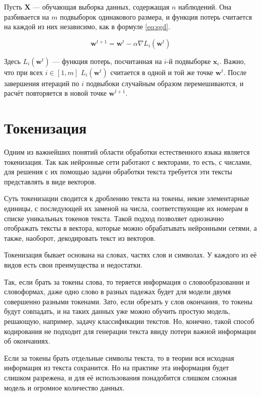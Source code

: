 Пусть $\mathbf{X}$ --- обучающая выборка данных, содержащая $n$ наблюдений. Она разбивается на $m$ подвыборок одинакового размера, и функция потерь считается на каждой из них независимо, как в формуле \ref*{eq:sgd}.

\begin{equation}
    \label{eq:sgd}
    \mathbf{w}^{t+1}=\mathbf{w}^t-\alpha \nabla L_i(\mathbf{w}^t)
\end{equation}

Здесь $L_i(\mathbf{w}^t)$ --- функция потерь, посчитанная на $i$-й подвыборке $\mathbf{x}_i$. Важно, что при всех $i\in[1, m]$ $L_i(\mathbf{w}^t)$ считается в одной и той же точке $\mathbf{w}^t$. После завершения итераций по $i$ подвыбоки случайным образом перемешиваются, и расчёт повторяется в новой точке $\mathbf{w}^{t+1}$.

\section{Токенизация}

Одним из важнейших понятий области обработки естественного языка является токенизация. Так как нейронные сети работают с векторами, то есть, с числами, для решения с их помощью задачи обработки текста требуется эти тексты представлять в виде векторов.

Суть токенизации сводится к дроблению текста на токены, некие элементарные единицы, с последующей их заменой на числа, соответствующие их номерам в списке уникальных токенов текста. Такой подход позволяет однозначно отображать тексты в вектора, которые можно обрабатывать нейронными сетями, а также, наоборот, декодировать текст из векторов.

Токенизация бывает основана на словах, частях слов и символах. У каждого из её видов есть свои преимущества и недостатки.

Так, если брать за токены слова, то теряется информация о словообразовании и словоформах, даже одно слово в разных падежах будет для модели двумя совершенно разными токенами. Зато, если обрезать у слов окончания, то токены будут совпадать, и на таких данных уже можно обучить простую модель, решающую, например, задачу классификации текстов. Но, конечно, такой способ кодирования не подходит для генерации текста ввиду потери важной информации об окончаниях.

Если за токены брать отдельные символы текста, то в теории вся исходная информация из текста сохранится. Но на практике эта информация будет слишком разрежена, и для её использования понадобится слишком сложная модель и огромное количество данных.

